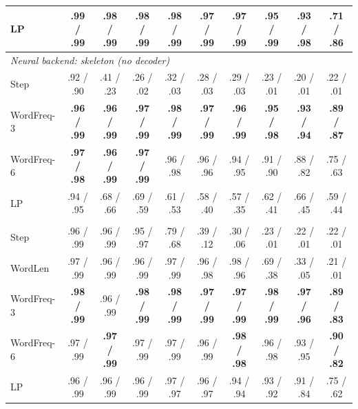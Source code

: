 \documentclass[11pt]{article}
\begin{document}
\begin{table}[tbp]
\begin{tabular}{l ccccccccc}
LP           & \textbf{.99 / .99} & .98 / .99 & .98 / .99 & .98 / .99 & .97 / .99 & .97 / .99 & .95 / .99 & .93 / .98 & .71 / .86 \\
\midrule
\multicolumn{10}{l}{\emph{Neural backend: skeleton (no decoder)}} \\
Step         & .92 / .90 & .41 / .23 & .26 / .02 & .32 / .03 & .28 / .03 & .29 / .03 & .23 / .01 & .20 / .01 & .22 / .01 \\
WordFreq-3   & \textbf{.96 / .99} & \textbf{.96 / .99} & \textbf{.97 / .99} & \textbf{.98 / .99} & \textbf{.97 / .99} & \textbf{.96 / .99} & \textbf{.95 / .98} & \textbf{.93 / .94} & \textbf{.89 / .87} \\
WordFreq-6   & \textbf{.97 / .98} & \textbf{.96 / .99} & \textbf{.97 / .99} & .96 / .98 & .96 / .96 & .94 / .95 & .91 / .90 & .88 / .82 & .75 / .63 \\
LP           & .94 / .95 & .68 / .66 & .69 / .59 & .61 / .53 & .58 / .40 & .57 / .35 & .62 / .41 & .66 / .45 & .59 / .44 \\
\addlinespace[2pt]
\multicolumn{10}{l}{\emph{Neural backend: reconstruction}} \\
Step         & .96 / .99 & .96 / .99 & .95 / .97 & .79 / .68 & .39 / .12 & .30 / .06 & .23 / .01 & .22 / .01 & .22 / .01 \\
WordLen      & .97 / .99 & .96 / .99 & .96 / .99 & .97 / .99 & .96 / .98 & .98 / .96 & .69 / .38 & .33 / .05 & .21 / .01 \\
WordFreq-3   & \textbf{.98 / .99} & .96 / .99 & \textbf{.98 / .99} & \textbf{.98 / .99} & \textbf{.97 / .99} & \textbf{.97 / .99} & \textbf{.98 / .99} & \textbf{.97 / .96} & \textbf{.89 / .83} \\
WordFreq-6   & .97 / .99 & \textbf{.97 / .99} & .97 / .99 & .97 / .99 & .96 / .99 & \textbf{.98 / .98} & .96 / .98 & .93 / .95 & \textbf{.90 / .82} \\
LP           & .96 / .99 & .96 / .99 & .96 / .99 & .97 / .97 & .96 / .97 & .94 / .94 & .93 / .92 & .91 / .84 & .75 / .62 \\
\bottomrule
\end{tabular}
\end{table}
\end{document}
